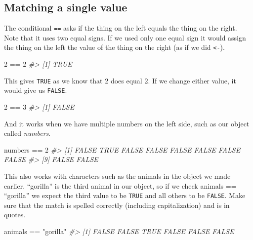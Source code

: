 \documentclass[
]{krantz}
\makeatletter
\newenvironment{Shaded}{\begin{snugshade}}{\end{snugshade}}
\newcommand{\CommentTok}[1]{\textcolor[rgb]{0.37,0.37,0.37}{\textit{#1}}}
\newcommand{\DecValTok}[1]{\textcolor[rgb]{0.06,0.06,0.06}{#1}}
\newcommand{\NormalTok}[1]{#1}
\newcommand{\SpecialCharTok}[1]{\textcolor[rgb]{0,0,0}{#1}}
\newcommand{\StringTok}[1]{\textcolor[rgb]{0.5,0.5,0.5}{#1}}
\newenvironment{kframe}{%
\medskip{}
\setlength{\fboxsep}{.8em}
 \def\at@end@of@kframe{}%
 \ifinner\ifhmode%
  \def\at@end@of@kframe{\end{minipage}}%
  \begin{minipage}{\columnwidth}%
 \fi\fi%
 \def\FrameCommand##1{\hskip\@totalleftmargin \hskip-\fboxsep
 \colorbox{shadecolor}{##1}\hskip-\fboxsep
     \hskip-\linewidth \hskip-\@totalleftmargin \hskip\columnwidth}%
 \MakeFramed {\advance\hsize-\width
   \@totalleftmargin\z@ \linewidth\hsize
   \@setminipage}}%
 {\par\unskip\endMakeFramed%
 \at@end@of@kframe}
\renewenvironment{Shaded}{\begin{kframe}}{\end{kframe}}
\makeatother
\begin{document}
\hypertarget{matching-a-single-value}{%
\subsection{Matching a single value}\label{matching-a-single-value}}

The conditional \texttt{==} asks if the thing on the left equals the thing on the right. Note that it uses two equal signs. If we used only one equal sign it would assign the thing on the left the value of the thing on the right (as if we did \texttt{\textless{}-}).

\begin{Shaded}
\begin{Highlighting}[]
\DecValTok{2} \SpecialCharTok{==} \DecValTok{2}
\CommentTok{\#\textgreater{} [1] TRUE}
\end{Highlighting}
\end{Shaded}

This gives \texttt{TRUE} as we know that 2 does equal 2. If we change either value, it would give us \texttt{FALSE}.

\begin{Shaded}
\begin{Highlighting}[]
\DecValTok{2} \SpecialCharTok{==} \DecValTok{3}
\CommentTok{\#\textgreater{} [1] FALSE}
\end{Highlighting}
\end{Shaded}

And it works when we have multiple numbers on the left side, such as our object called \emph{numbers}.

\begin{Shaded}
\begin{Highlighting}[]
\NormalTok{numbers }\SpecialCharTok{==} \DecValTok{2}
\CommentTok{\#\textgreater{}  [1] FALSE  TRUE FALSE FALSE FALSE FALSE FALSE FALSE}
\CommentTok{\#\textgreater{}  [9] FALSE FALSE}
\end{Highlighting}
\end{Shaded}

This also works with characters such as the animals in the object we made earlier. ``gorilla'' is the third animal in our object, so if we check animals == ``gorilla'' we expect the third value to be \texttt{TRUE} and all others to be \texttt{FALSE}. Make sure that the match is spelled correctly (including capitalization) and is in quotes.

\begin{Shaded}
\begin{Highlighting}[]
\NormalTok{animals }\SpecialCharTok{==} \StringTok{"gorilla"}
\CommentTok{\#\textgreater{} [1] FALSE FALSE  TRUE FALSE FALSE FALSE}
\end{Highlighting}
\end{Shaded}
\end{document}
